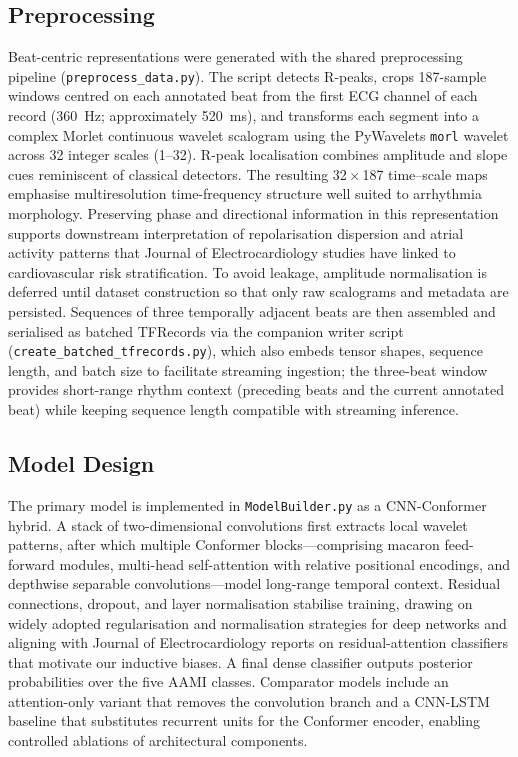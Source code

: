 \subsection{Preprocessing}
Beat-centric representations were generated with the shared preprocessing pipeline (\texttt{preprocess\_data.py}). The script detects R-peaks, crops 187-sample windows centred on each annotated beat from the first ECG channel of each record (360~Hz; approximately 520~ms), and transforms each segment into a complex Morlet continuous wavelet scalogram using the PyWavelets \texttt{morl} wavelet across 32 integer scales (1--32). R-peak localisation combines amplitude and slope cues reminiscent of classical detectors\cite{pan1985real,laguna1994automatic}. The resulting 32\,$\times$\,187 time--scale maps emphasise multiresolution time-frequency structure well suited to arrhythmia morphology\cite{addison2005wavelet,torrence1998practical,mallat1989wavelet}. Preserving phase and directional information in this representation supports downstream interpretation of repolarisation dispersion and atrial activity patterns that Journal of Electrocardiology studies have linked to cardiovascular risk stratification\cite{ozderya2024relationship,sbrollini2024directionalities,liu2024association}. To avoid leakage, amplitude normalisation is deferred until dataset construction so that only raw scalograms and metadata are persisted. Sequences of three temporally adjacent beats are then assembled and serialised as batched TFRecords via the companion writer script (\texttt{create\_batched\_tfrecords.py}), which also embeds tensor shapes, sequence length, and batch size to facilitate streaming ingestion; the three-beat window provides short-range rhythm context (preceding beats and the current annotated beat) while keeping sequence length compatible with streaming inference.

\subsection{Model Design}
The primary model is implemented in \texttt{ModelBuilder.py} as a CNN-Conformer hybrid. A stack of two-dimensional convolutions first extracts local wavelet patterns, after which multiple Conformer blocks---comprising macaron feed-forward modules, multi-head self-attention with relative positional encodings, and depthwise separable convolutions---model long-range temporal context\cite{vaswani2017attention}. Residual connections, dropout, and layer normalisation stabilise training, drawing on widely adopted regularisation and normalisation strategies for deep networks\cite{he2016deep,srivastava2014dropout,ba2016layer} and aligning with Journal of Electrocardiology reports on residual-attention classifiers that motivate our inductive biases\cite{rahman2024residual}. A final dense classifier outputs posterior probabilities over the five AAMI classes. Comparator models include an attention-only variant that removes the convolution branch and a CNN-LSTM baseline that substitutes recurrent units for the Conformer encoder, enabling controlled ablations of architectural components.


